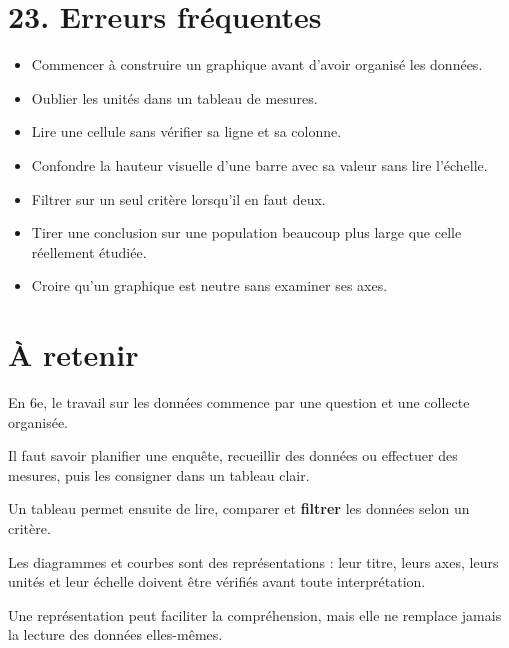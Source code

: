 \section{23. Erreurs fréquentes}

\begin{itemize}
\item Commencer à construire un graphique avant d'avoir organisé les données.
\item Oublier les unités dans un tableau de mesures.
\item Lire une cellule sans vérifier sa ligne et sa colonne.
\item Confondre la hauteur visuelle d'une barre avec sa valeur sans lire l'échelle.
\item Filtrer sur un seul critère lorsqu'il en faut deux.
\item Tirer une conclusion sur une population beaucoup plus large que celle réellement étudiée.
\item Croire qu'un graphique est neutre sans examiner ses axes.
\end{itemize}

\section{À retenir}

\begin{aretenir}
En 6e, le travail sur les données commence par une question et une collecte organisée.

Il faut savoir planifier une enquête, recueillir des données ou effectuer des mesures, puis les consigner dans un tableau clair.

Un tableau permet ensuite de lire, comparer et \textbf{filtrer} les données selon un critère.

Les diagrammes et courbes sont des représentations : leur titre, leurs axes, leurs unités et leur échelle doivent être vérifiés avant toute interprétation.

Une représentation peut faciliter la compréhension, mais elle ne remplace jamais la lecture des données elles-mêmes.
\end{aretenir}
